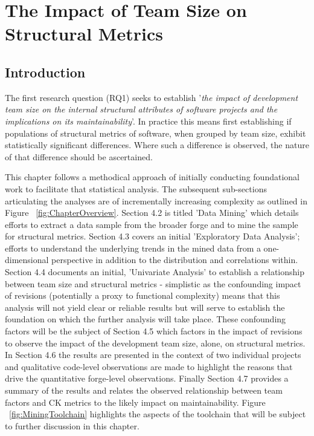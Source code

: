 
\graphicspath{{Chapter4/Figures/}{Chapter4/Tables/}{Chapter4/Charts/}}

\chapter{The Impact of Team Size on Structural Metrics}
\section{Introduction} %

The first research question (RQ1) seeks to establish '\textit{the impact of development team size on the internal structural attributes of software projects and the implications on its maintainability}'. In practice this means first establishing if populations of structural metrics of software, when grouped by team size, exhibit statistically significant differences. Where such a difference is observed, the nature of that difference should be ascertained.

This chapter follows a methodical approach of initially conducting foundational work to facilitate that statistical analysis. The subsequent sub-sections articulating the analyses are of incrementally increasing complexity as outlined in Figure ~\ref{fig:ChapterOverview}. Section 4.2 is titled 'Data Mining' which details efforts to extract a data sample from the broader forge and to mine the sample for structural metrics. Section 4.3 covers an initial 'Exploratory Data Analysis'; efforts to understand the underlying trends in the mined data from a one-dimensional perspective in addition to the distribution and correlations within. Section 4.4 documents an initial, 'Univariate Analysis' to establish a relationship between team size and structural metrics - simplistic as the confounding impact of revisions (potentially a proxy to functional complexity) means that this analysis will not yield clear or reliable results but will serve to establish the foundation on which the further analysis will take place. These confounding factors will be the subject of Section 4.5 which factors in the impact of revisions to observe the impact of the development team size, alone, on structural metrics. In Section 4.6 the results are presented in the context of two individual projects and qualitative code-level observations are made to highlight the reasons that drive the quantitative forge-level observations. Finally Section 4.7 provides a summary of the results and relates the observed relationship between team factors and CK metrics to the likely impact on maintainability. Figure ~\ref{fig:MiningToolchain} highlights the aspects of the toolchain that will be subject to further discussion in this chapter.

